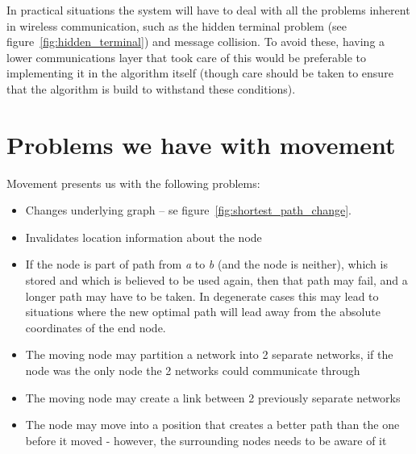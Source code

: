 \documentclass[letter, 12pt, english, draft]{article}
\begin{document}

In practical situations the system will have to deal with all the problems inherent in wireless communication, such as the hidden terminal problem (see figure~\ref{fig:hidden_terminal}) and message collision. To avoid these, having a lower communications layer that took care of this would be preferable to implementing it in the algorithm itself (though care should be taken to ensure that the algorithm is build to withstand these conditions).

\section{Problems we have with movement}

Movement presents us with the following problems:


\begin{itemize}
\item Changes underlying graph -- se figure~\ref{fig:shortest_path_change}.
\item Invalidates location information about the node
\item If the node is part of path from \emph{a} to \emph{b} (and the node is neither), which is stored and which is believed to be used again, then that path may fail, and a longer path may have to be taken. In degenerate cases this may lead to situations where the new optimal path will lead away from the absolute coordinates of the end node.
\item The moving node may partition a network into 2 separate networks, if the node was the only node the 2 networks could communicate through
\item The moving node may create a link between 2 previously separate networks
\item The node may move into a position that creates a better path than the one before it moved - however, the surrounding nodes needs to be aware of it
\end{itemize}
\end{document}
